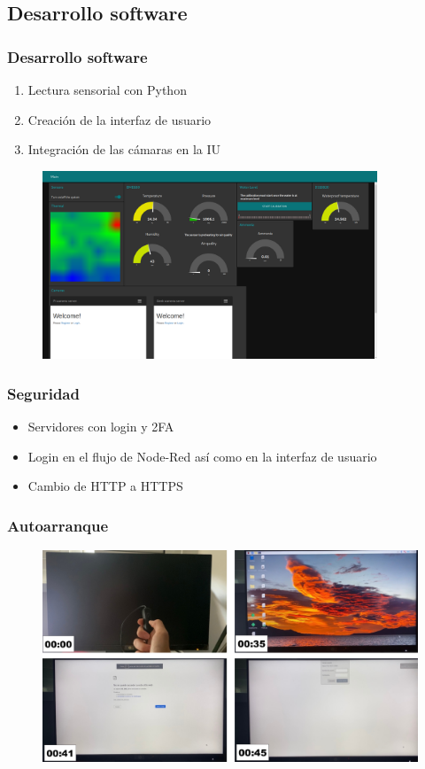 \documentclass{beamer}
\begin{document}
\subsection{Desarrollo software}
\begin{frame}
\frametitle{Desarrollo software}
\begin{enumerate}
\item Lectura sensorial con Python
\item Creación de la interfaz de usuario
\item Integración de las cámaras en la IU
\end{enumerate}
\begin{figure}
\centering
\includegraphics[width=10cm]{figs/UIcompleta}
\end{figure}
\end{frame}

\begin{frame}
\frametitle{Seguridad}
\begin{itemize}
\item Servidores con login y 2FA
\item Login en el flujo de Node-Red así como en la interfaz de usuario
\item Cambio de HTTP a HTTPS
\end{itemize}
\end{frame}

\begin{frame}
\frametitle{Autoarranque}
\begin{figure}
\centering
\includegraphics[width=12cm]{figs/autoarranque}
\end{figure}
\end{frame}
\end{document}
